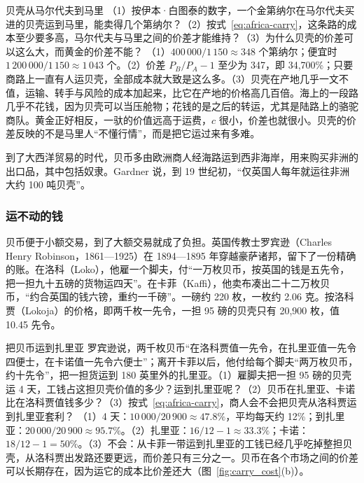 \begin{example}{贝壳从马尔代夫到马里}\label{ex:africa-cowrie}
（1）按伊本·白图泰的数字，一个金第纳尔在马尔代夫买进的贝壳运到马里，能卖得几个第纳尔？（2）按式~\eqref{eq:africa-carry}，这条路的成本至少要多高，马尔代夫与马里之间的价差才能维持？（3）为什么贝壳的价差可以这么大，而黄金的价差不能？
\solution （1）$400\,000/1\,150\approx348$ 个第纳尔；便宜时 $1\,200\,000/1\,150\approx1\,043$ 个。（2）价差 $P_B/P_A-1$ 至少为 347，即 34,700\%；只要商路上一直有人运贝壳，全部成本就大致是这么多。（3）贝壳在产地几乎一文不值，运输、转手与风险的成本加起来，比它在产地的价格高几百倍。海上的一段路几乎不花钱，因为贝壳可以当压舱物；花钱的是之后的转运，尤其是陆路上的骆驼商队。黄金正好相反，一驮的价值远高于运费，$c$ 很小，价差也就很小。贝壳的价差反映的不是马里人“不懂行情”，而是把它运过来有多难。
\end{example}

到了大西洋贸易的时代，贝币多由欧洲商人经海路运到西非海岸，用来购买非洲的出口品，其中包括奴隶。Gardner 说，到 19 世纪初，“仅英国人每年就运往非洲大约 100 吨贝壳”\cite{gardner2015}。

\subsubsection{运不动的钱}
贝币便于小额交易，到了大额交易就成了负担。英国传教士罗宾逊（Charles Henry Robinson，1861—1925）在 1894—1895 年穿越豪萨诸邦，留下了一份精确的账\cite{robinson1896}。在洛科（Loko），他雇一个脚夫，付“一万枚贝币，按英国的钱是五先令，把一担九十五磅的货物运四天”。在卡菲（Kaffi），他卖布凑出二十二万枚贝币，“约合英国的钱六镑，重约一千磅”\cite{robinson1896}。一磅约 220 枚，一枚约 2.06 克。按洛科贾（Lokoja）的价格，即两千枚一先令，一担 95 磅的贝壳只有 20,900 枚，值 10.45 先令。

\begin{example}{把贝币运到扎里亚}\label{ex:africa-carry}
罗宾逊说，两千枚贝币“在洛科贾值一先令，在扎里亚值一先令四便士，在卡诺值一先令六便士”；离开卡菲以后，他付给每个脚夫“两万枚贝币，约十先令”，把一担货运到 180 英里外的扎里亚\cite{robinson1896}。（1）雇脚夫把一担 95 磅的贝壳运 4 天，工钱占这担贝壳价值的多少？运到扎里亚呢？（2）贝币在扎里亚、卡诺比在洛科贾值钱多少？（3）按式~\eqref{eq:africa-carry}，商人会不会把贝壳从洛科贾运到扎里亚套利？
\solution （1）4 天：$10\,000/20\,900\approx47.8\%$，平均每天约 12\%；到扎里亚：$20\,000/20\,900\approx95.7\%$。（2）扎里亚：$16/12-1\approx33.3\%$；卡诺：$18/12-1=50\%$。（3）不会：从卡菲一带运到扎里亚的工钱已经几乎吃掉整担贝壳，从洛科贾出发路还要更远，而价差只有三分之一。贝币在各个市场之间的价差可以长期存在，因为运它的成本比价差还大（图~\ref{fig:carry_cost}(b)）。
\end{example}

